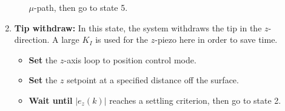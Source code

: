 \begin{enumerate}
\begin{itemize}
    $\mu$-path,
    then go to state 5.
  \end{itemize}
\item \textbf{Tip withdraw:} In this state, the system withdraws the tip in the
  $z$-direction. A large $K_I$ is used for the $z$-piezo here in order to save
  time.
  \begin{itemize}
  \item \textbf{Set} the $z$-axis loop to position control mode.
  \item \textbf{Set} the $z$ setpoint at a specified distance off the surface.
  \item \textbf{Wait until} $|e_z(k)|$ reaches a settling criterion, then go to
    state 2.
  \end{itemize}
\end{enumerate}
